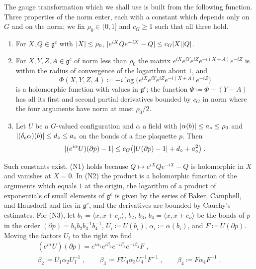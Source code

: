 The gauge transformation which we shall use is built from the following function. Three properties of the norm enter, each with a constant which depends only on $G$ and on the norm; we fix $\rho_0 \in (0, 1]$ and $c_G \geq 1$ such that all three hold.
\begin{enumerate}[label=(N\arabic*)]
\item For $X, Q \in \mathfrak g^c$ with $\lvert X\rvert \leq \rho_0$, $\lvert e^{iX}Qe^{-iX} - Q\rvert \leq c_G\lvert X\rvert\lvert Q\rvert$.
\item For $X, Y, Z, A \in \mathfrak g^c$ of norm less than $\rho_0$ the matrix $e^{iX}e^{iY}e^{iZ}e^{-i(X + A)}e^{-iZ}$ is within the radius of convergence of the logarithm about $1$, and
\begin{equation}\label{eq:reduction-function}
    \Phi(X, Y, Z, A) \coloneqq -i\log\bigl(e^{iX}e^{iY}e^{iZ}e^{-i(X + A)}e^{-iZ}\bigr)
\end{equation}
is a holomorphic function with values in $\mathfrak g^c$; the function $\Psi \coloneqq \Phi - (Y - A)$ has all its first and second partial derivatives bounded by $c_G$ in norm where the four arguments have norm at most $\rho_0/2$.
\item Let $U$ be a $G$-valued configuration and $\alpha$ a field with $\lvert\alpha(b)\rvert \leq a_\circ \leq \rho_0$ and $\lvert(\delta_e\alpha)(b)\rvert \leq d_\circ \leq a_\circ$ on the bonds of a fine plaquette $p$. Then
\begin{equation}\label{eq:complex-curvature}
    \lvert(e^{i\alpha}U)(\partial p) - 1\rvert \leq c_G\bigl(\lvert U(\partial p) - 1\rvert + d_\circ + a_\circ^2\bigr)\;.
\end{equation}
\end{enumerate}
Such constants exist. (N1) holds because $Q \mapsto e^{iX}Qe^{-iX} - Q$ is holomorphic in $X$ and vanishes at $X = 0$. In (N2) the product is a holomorphic function of the arguments which equals $1$ at the origin, the logarithm of a product of exponentials of small elements of $\mathfrak g^c$ is given by the series of Baker, Campbell, and Hausdorff and lies in $\mathfrak g^c$, and the derivatives are bounded by Cauchy's estimates. For (N3), let $b_1 = \langle x, x + e_\mu\rangle$, $b_2$, $b_3$, $b_4 = \langle x, x + e_\nu\rangle$ be the bonds of $p$ in the order $(\partial p) = b_1b_2b_3^{-1}b_4^{-1}$, $U_i \coloneqq U(b_i)$, $\alpha_i \coloneqq \alpha(b_i)$, and $F \coloneqq U(\partial p)$. Moving the factors $U_i$ to the right we find
\begin{gather*}
    (e^{i\alpha}U)(\partial p) = e^{i\alpha_1}e^{i\beta_2}e^{-i\beta_3}e^{-i\beta_4}F\;,\\
    \beta_2 \coloneqq U_1\alpha_2U_1^{-1}\;,
    \qquad
    \beta_3 \coloneqq FU_4\alpha_3U_4^{-1}F^{-1}\;,
    \qquad
    \beta_4 \coloneqq F\alpha_4F^{-1}\;.
\end{gather*}
